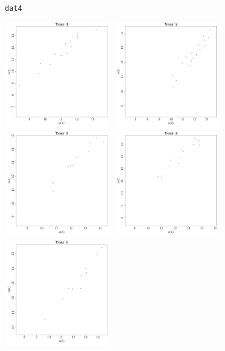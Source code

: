 \documentclass{article}\usepackage[]{graphicx}\usepackage[]{color}
\makeatletter
\newcommand{\hlstd}[1]{\textcolor[rgb]{0.345,0.345,0.345}{#1}}%
\newenvironment{kframe}{%
 \def\at@end@of@kframe{}%
 \ifinner\ifhmode%
  \def\at@end@of@kframe{\end{minipage}}%
  \begin{minipage}{\columnwidth}%
 \fi\fi%
 \def\FrameCommand##1{\hskip\@totalleftmargin \hskip-\fboxsep
 \colorbox{shadecolor}{##1}\hskip-\fboxsep
     \hskip-\linewidth \hskip-\@totalleftmargin \hskip\columnwidth}%
 \MakeFramed {\advance\hsize-\width
   \@totalleftmargin\z@ \linewidth\hsize
   \@setminipage}}%
 {\par\unskip\endMakeFramed%
 \at@end@of@kframe}
\newenvironment{knitrout}{}{} %
\makeatother
\begin{document}
\begin{knitrout}
\begin{kframe}
{\ttfamily\noindent\bfseries\color{errorcolor}{\#\# Error: object 'temp' not found}}\begin{alltt}
\hlstd{dat4}
\end{alltt}


{\ttfamily\noindent\bfseries\color{errorcolor}{\#\# Error: object 'dat4' not found}}\end{kframe}
\includegraphics[width=0.35\textwidth]{figure/Reshaping1} 
\includegraphics[width=0.35\textwidth]{figure/Reshaping2} 
\includegraphics[width=0.35\textwidth]{figure/Reshaping3} 
\includegraphics[width=0.35\textwidth]{figure/Reshaping4} 
\includegraphics[width=0.35\textwidth]{figure/Reshaping5} 

\end{knitrout}
\end{document}
